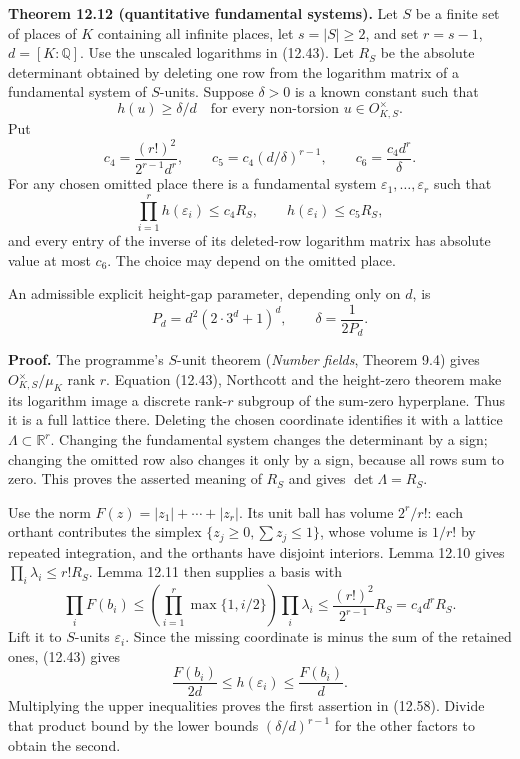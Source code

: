 \documentclass[
  11pt,
  a4paper,
]{article}
\begin{document}
\textbf{Theorem 12.12 (quantitative fundamental systems).} Let \(S\) be
a finite set of places of \(K\) containing all infinite places, let
\(s=|S|\ge2\), and set \(r=s-1\), \(d=[K:\mathbb Q]\). Use the unscaled
logarithms in (12.43). Let \(R_S\) be the absolute determinant obtained
by deleting one row from the logarithm matrix of a fundamental system of
\(S\)-units. Suppose \(\delta>0\) is a known constant such that \[
h(u)\ge\delta/d
\quad\text{for every non-torsion }u\in O_{K,S}^{\times}.
\tag{12.56}
\] Put \[
c_4=\frac{(r!)^2}{2^{r-1}d^r},\qquad
c_5=c_4(d/\delta)^{r-1},\qquad
c_6=\frac{c_4d^r}{\delta}.
\tag{12.57}
\] For any chosen omitted place there is a fundamental system
\(\varepsilon_1,\ldots,\varepsilon_r\) such that \[
\prod_{i=1}^r h(\varepsilon_i)\le c_4R_S,\qquad
h(\varepsilon_i)\le c_5R_S,
\tag{12.58}
\] and every entry of the inverse of its deleted-row logarithm matrix
has absolute value at most \(c_6\). The choice may depend on the omitted
place.

An admissible explicit height-gap parameter, depending only on \(d\), is
\[
P_d=d^2(2\cdot3^d+1)^d,\qquad \delta=\frac1{2P_d}.
\tag{12.59}
\]

\textbf{Proof.} The programme's \(S\)-unit theorem (\emph{Number
fields}, Theorem 9.4) gives \(O_{K,S}^\times/\mu_K\) rank \(r\).
Equation (12.43), Northcott and the height-zero theorem make its
logarithm image a discrete rank-\(r\) subgroup of the sum-zero
hyperplane. Thus it is a full lattice there. Deleting the chosen
coordinate identifies it with a lattice \(\Lambda\subset\mathbb R^r\).
Changing the fundamental system changes the determinant by a sign;
changing the omitted row also changes it only by a sign, because all
rows sum to zero. This proves the asserted meaning of \(R_S\) and gives
\(\det\Lambda=R_S\).

Use the norm \(F(z)=|z_1|+\cdots+|z_r|\). Its unit ball has volume
\(2^r/r!\): each orthant contributes the simplex
\(\{z_j\ge0,\sum z_j\le1\}\), whose volume is \(1/r!\) by repeated
integration, and the orthants have disjoint interiors. Lemma 12.10 gives
\(\prod_i\lambda_i\le r!R_S\). Lemma 12.11 then supplies a basis with \[
\prod_iF(b_i)\le
\left(\prod_{i=1}^r\max\{1,i/2\}\right)\prod_i\lambda_i
\le\frac{(r!)^2}{2^{r-1}}R_S=c_4d^rR_S.
\tag{12.60}
\] Lift it to \(S\)-units \(\varepsilon_i\). Since the missing
coordinate is minus the sum of the retained ones, (12.43) gives \[
\frac{F(b_i)}{2d}\le h(\varepsilon_i)
                       \le\frac{F(b_i)}d.
\tag{12.61}
\] Multiplying the upper inequalities proves the first assertion in
(12.58). Divide that product bound by the lower bounds
\((\delta/d)^{r-1}\) for the other factors to obtain the second.
\end{document}
